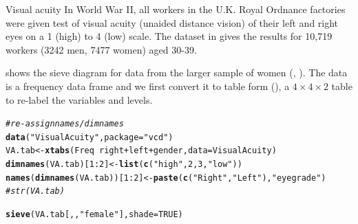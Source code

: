 \documentclass[11pt]{book}\usepackage[]{graphicx}\usepackage[]{color}
\makeatletter
\newcommand{\hlnum}[1]{\textcolor[rgb]{0.686,0.059,0.569}{#1}}%
\newcommand{\hlstr}[1]{\textcolor[rgb]{0.192,0.494,0.8}{#1}}%
\newcommand{\hlcom}[1]{\textcolor[rgb]{0.678,0.584,0.686}{\textit{#1}}}%
\newcommand{\hlopt}[1]{\textcolor[rgb]{0,0,0}{#1}}%
\newcommand{\hlstd}[1]{\textcolor[rgb]{0.345,0.345,0.345}{#1}}%
\newcommand{\hlkwb}[1]{\textcolor[rgb]{0.69,0.353,0.396}{#1}}%
\newcommand{\hlkwc}[1]{\textcolor[rgb]{0.333,0.667,0.333}{#1}}%
\newcommand{\hlkwd}[1]{\textcolor[rgb]{0.737,0.353,0.396}{\textbf{#1}}}%
\newenvironment{kframe}{%
 \def\at@end@of@kframe{}%
 \ifinner\ifhmode%
  \def\at@end@of@kframe{\end{minipage}}%
  \begin{minipage}{\columnwidth}%
 \fi\fi%
 \def\FrameCommand##1{\hskip\@totalleftmargin \hskip-\fboxsep
 \colorbox{shadecolor}{##1}\hskip-\fboxsep
     \hskip-\linewidth \hskip-\@totalleftmargin \hskip\columnwidth}%
 \MakeFramed {\advance\hsize-\width
   \@totalleftmargin\z@ \linewidth\hsize
   \@setminipage}}%
 {\par\unskip\endMakeFramed%
 \at@end@of@kframe}
\newenvironment{knitrout}{}{} %
\renewenvironment{knitrout}{\small\renewcommand{\baselinestretch}{.85}}{} %
\makeatother
\begin{document}
\begin{Example}[vision1]{Visual acuity}
In World War II, all workers in the U.K. Royal Ordnance factories
were given test of visual acuity (unaided distance vision)
of their left and right eyes
on a 1 (high) to 4 (low) scale.  The dataset 
in  gives the results for 10,719 workers
(3242 men, 7477 women) aged 30-39.

 shows the sieve diagram for data 
from the larger sample of women
(\citet[Table 33.5]{KendallStuart:61},
\citet[p. 284]{Bishop-etal:75}).
The  data is a frequency data frame
and we first convert it to table form (), 
a $4 \times 4 \times 2$
table to re-label the variables and levels.
\begin{knitrout}
\color{fgcolor}\begin{kframe}
\begin{alltt}
\hlcom{# re-assign names/dimnames}
\hlkwd{data}\hlstd{(}\hlstr{"VisualAcuity"}\hlstd{,} \hlkwc{package}\hlstd{=}\hlstr{"vcd"}\hlstd{)}
\hlstd{VA.tab} \hlkwb{<-} \hlkwd{xtabs}\hlstd{(Freq} \hlopt{~} \hlstd{right} \hlopt{+} \hlstd{left} \hlopt{+} \hlstd{gender,} \hlkwc{data}\hlstd{=VisualAcuity)}
\hlkwd{dimnames}\hlstd{(VA.tab)[}\hlnum{1}\hlopt{:}\hlnum{2}\hlstd{]} \hlkwb{<-} \hlkwd{list}\hlstd{(}\hlkwd{c}\hlstd{(}\hlstr{"high"}\hlstd{,} \hlnum{2}\hlstd{,} \hlnum{3}\hlstd{,} \hlstr{"low"}\hlstd{))}
\hlkwd{names}\hlstd{(}\hlkwd{dimnames}\hlstd{(VA.tab))[}\hlnum{1}\hlopt{:}\hlnum{2}\hlstd{]} \hlkwb{<-} \hlkwd{paste}\hlstd{(}\hlkwd{c}\hlstd{(}\hlstr{"Right"}\hlstd{,} \hlstr{"Left"}\hlstd{),} \hlstr{"eye grade"}\hlstd{)}
\hlcom{#str(VA.tab)}
\end{alltt}
\end{kframe}
\end{knitrout}


\begin{knitrout}
\color{fgcolor}\begin{kframe}
\begin{alltt}
\hlkwd{sieve}\hlstd{(VA.tab[,,}\hlstr{"female"}\hlstd{],} \hlkwc{shade}\hlstd{=}\hlnum{TRUE}\hlstd{)}
\end{alltt}
\end{kframe}\begin{figure}[htbp]



\end{figure}
\end{knitrout}
\end{Example}
\end{document}
